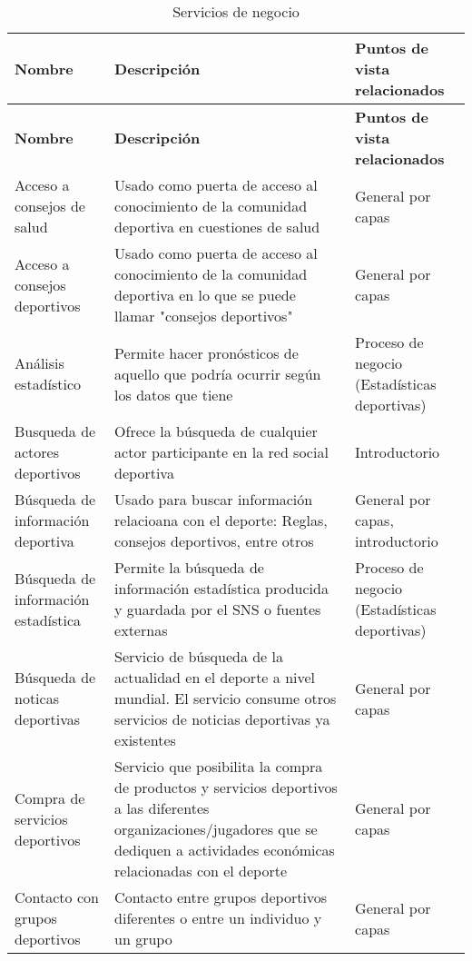 \begin{center}
	\begin{longtable}{|p{4cm}|p{7cm}|p{4cm}|}
		\caption{Servicios de negocio \label{tab:servicios_negocio}} \\
		\hline
		\textbf{Nombre} &
		\textbf{Descripción} &
		\textbf{Puntos de vista relacionados} \\
		\hline
		\endfirsthead
		\hline
		\textbf{Nombre} &
		\textbf{Descripción} &
		\textbf{Puntos de vista relacionados} \\
		\hline
		\endhead
		\hline
		\endfoot
		\hline
		\endlastfoot
		Acceso a consejos de salud & 
		Usado como puerta de acceso al conocimiento de la comunidad deportiva en cuestiones de salud & 
		General por capas
		\\
		\hline
		Acceso a consejos deportivos & 
		Usado como puerta de acceso al conocimiento de la comunidad deportiva en lo que se puede llamar "consejos deportivos" & 
		General por capas
		\\
		\hline
		Análisis estadístico & 
		Permite hacer pronósticos de aquello que podría ocurrir según los datos que tiene & 
		Proceso de negocio (Estadísticas deportivas)
		\\
		\hline
		Busqueda de actores deportivos & 
		Ofrece la búsqueda de cualquier actor participante en la red social deportiva & 
		Introductorio
		\\
		\hline
		Búsqueda de información deportiva & 
		Usado para buscar información relacioana con el deporte: Reglas, consejos deportivos, entre otros & 
		General por capas, introductorio
		\\
		\hline
		Búsqueda de información estadística & 
		Permite la búsqueda de información estadística producida y guardada por el SNS o fuentes externas & 
		Proceso de negocio (Estadísticas deportivas)
		\\
		\hline
		Búsqueda de noticas deportivas & 
		Servicio de búsqueda de la actualidad en el deporte a nivel mundial. El servicio consume otros servicios de noticias deportivas ya existentes & 
		General por capas
		\\
		\hline
		Compra de servicios deportivos & 
		Servicio que posibilita la compra de productos y servicios deportivos a las diferentes organizaciones/jugadores que se dediquen a actividades económicas relacionadas con el deporte & 
		General por capas
		\\
		\hline
		Contacto con grupos deportivos & 
		Contacto entre grupos deportivos diferentes o entre un individuo y un grupo & 
		General por capas

\end{longtable}
\end{center}
